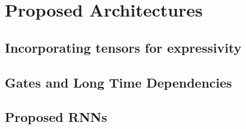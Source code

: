 \chapter{Proposed Architectures}\label{C:arch}
\section{Incorporating tensors for expressivity}
\section{Gates and Long Time Dependencies}
\section{Proposed RNNs}